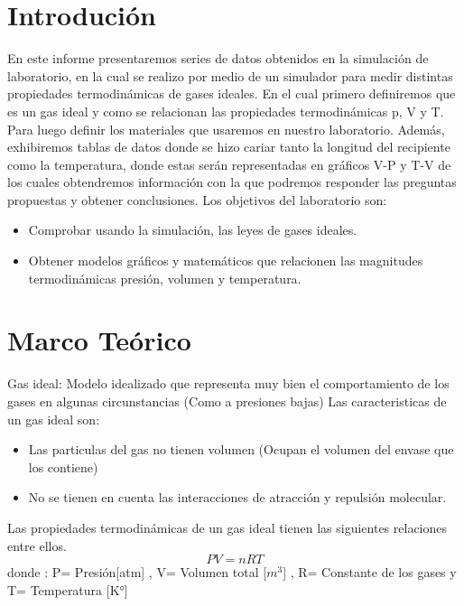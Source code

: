 \documentclass[]{article}
\begin{document}
\tableofcontents

\section{Introdución}
En este informe presentaremos series de datos obtenidos en la simulación de laboratorio, en la cual se realizo por medio de un simulador para medir distintas propiedades termodinámicas de gases ideales.
En el cual primero definiremos que es un gas ideal y como se relacionan las propiedades termodinámicas p, V y T. Para luego definir los materiales que usaremos en nuestro laboratorio.
Además, exhibiremos tablas de datos donde se hizo cariar tanto la longitud del recipiente como la temperatura, donde estas serán representadas en gráficos V-P y T-V de los cuales obtendremos información con la que podremos responder las preguntas propuestas y obtener conclusiones.
Los objetivos del laboratorio son:
 \begin{itemize}  %
      \item Comprobar usando la simulación, las leyes de gases ideales.
      \item Obtener modelos gráficos y matemáticos que relacionen las magnitudes termodinámicas presión,
      volumen y temperatura.
\end{itemize}


\section{Marco Teórico}
Gas ideal: Modelo idealizado que representa muy bien el comportamiento 
de los gases en algunas circunstancias (Como a presiones bajas)
Las caracteristicas de un gas ideal son:
\begin{itemize}
      \item Las particulas del gas no tienen volumen (Ocupan el volumen del envase que los contiene)
      \item No se tienen en cuenta las interacciones de atracción y repulsión molecular.
\end{itemize}
Las propiedades termodinámicas de un gas ideal tienen las siguientes relaciones entre ellos.
\begin{equation*}
      PV=nRT
\end{equation*}
donde :
P= Presión[atm]   , V= Volumen total [$m^3$] , R= Constante de los gases  y  T= Temperatura [K°]

\newpage
\end{document}
